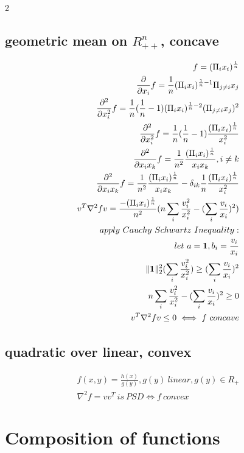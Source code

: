 \documentclass[8pt]{extarticle}
\begin{document}
\begin{multicols*}{2}
  \subsection{geometric mean on $R_{++}^n$, concave}
  \begin{align*}
    f=(\Pi_i x_i)^{\frac{1}{n}}\\
    \frac{\partial}{\partial x_i} f = \frac{1}{n}(\Pi_i x_i)^{\frac{1}{n}-1}\Pi_{j\not=i}x_j\\
    \frac{\partial^2}{\partial x_i^2} f = \frac{1}{n}(\frac{1}{n}-1)(\Pi_i x_i)^{\frac{1}{n}-2}(\Pi_{j\not=i}x_j)^2\\
    \frac{\partial^2}{\partial x_i^2} f = \frac{1}{n}(\frac{1}{n}-1)\frac{(\Pi_i x_i)^{\frac{1}{n}}}{x_i^2}\\
    \frac{\partial^2}{\partial x_i x_k} f = \frac{1}{n^2}\frac{(\Pi_i x_i)^{\frac{1}{n}}}{x_i x_k}, i\not=k\\
    \frac{\partial^2}{\partial x_i x_k} f = \frac{1}{n^2}\frac{(\Pi_i x_i)^{\frac{1}{n}}}{x_i x_k} -\delta_{ik} \frac{1}{n}\frac{(\Pi_i x_i)^{\frac{1}{n}}}{x_i^2}
    \\
    v^T \nabla^2 f v = \frac{-(\Pi_i x_i)^{\frac{1}{n}}}{n^2}(n \sum_i \frac{v_i^2}{x_i^2} - (\sum_i \frac{v_i}{x_i})^2)\\\
    apply\ Cauchy\ Schwartz\ Inequality:\\
    let\ a=\bold{1}, b_i = \frac{v_i}{x_i}\\
    \|\bold{1}\|_2^2 (\sum_i \frac{v_i^2}{x_i^2}) \geq (\sum_i \frac{v_i}{x_i})^2\\
    n \sum_i \frac{v_i^2}{x_i^2} - (\sum_i \frac{v_i}{x_i})^2 \geq 0\\
    v^T \nabla^2 f v \leq 0 \iff f\ concave
  \end{align*}

  \subsection{quadratic over linear, convex}
  \begin{align*}
    f(x,y) = \frac{h(x)}{g(y)}, g(y) \ linear, g(y) \in R_+\\
    \nabla^2 f = vv^T \ is\ PSD \iff f\ convex
  \end{align*}

  \vfill\null
  \columnbreak
  
  \section{Composition of functions}


\end{multicols*}
\end{document}
